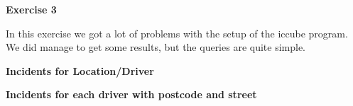 {\bf \Huge Exercise 3}
\vspace{1cm}

In this exercise we got a lot of problems with the setup of the iccube program. 
We did manage to get some results, but the queries are quite simple.

\vspace{1cm }
{\Large \bf Incidents for Location/Driver}
\begin{figure}[H]
\end{figure}

\clearpage
{\Large \bf Incidents for each driver with postcode and street}
\begin{figure}[H]
\end{figure}

